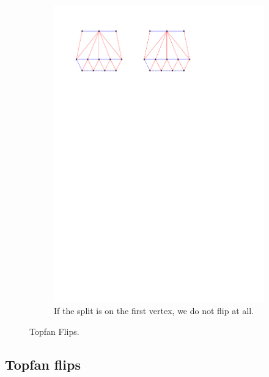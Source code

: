 \begin{figure}[!b]
\begin{subfigure}[t]{0.45 \textwidth}
        \includegraphics[width =\textwidth]{topFanFlips/img/splitfront}
        \caption{If the split is on the first vertex, we do not flip at all.}
        \label{fig:fanflip:splitFirstVertex}
    \end{subfigure}

    \caption{Topfan Flips.}
    \label{fig:fanflip:fanflips}
\end{figure}

\subsection{Topfan flips}
\thispagestyle{plain}
\label{ss:fanflip}

